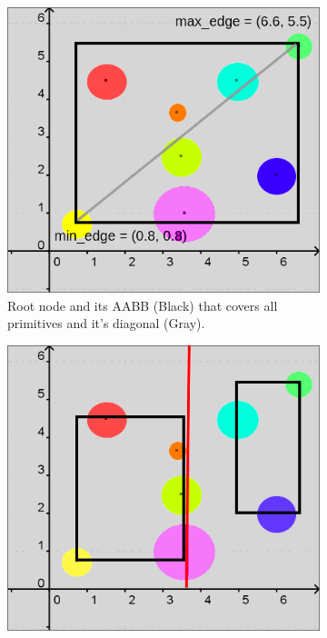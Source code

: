 \documentclass[11pt,a4paper]{article}
\begin{document}
\begin{figure}[h]	
     \centering
     \begin{subfigure}[t]{0.3\textwidth}
         \centering
         \includegraphics[width=\textwidth]{images/example_bvh/2_g.png}
         \captionsetup{justification=centering,margin=0.1cm}
         \caption{Root node and its AABB (Black) that covers all primitives and it's diagonal (Gray).}
         \label{fig:pi_4000}
     \end{subfigure}
     \hfill
     \begin{subfigure}[t]{0.3\textwidth}
         \centering
         \includegraphics[width=\textwidth]{images/example_bvh/3_g.png}

\end{subfigure}
\end{figure}
\end{document}
